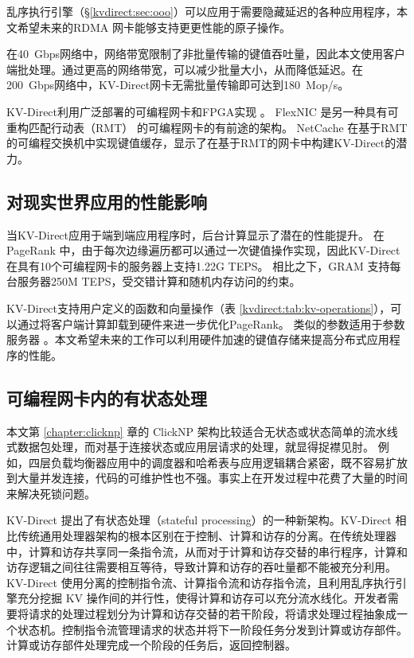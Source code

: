 乱序执行引擎（\S \ref {kvdirect:sec:ooo}）可以应用于需要隐藏延迟的各种应用程序，本文希望未来的RDMA 网卡能够支持更更性能的原子操作。

在40~Gbps网络中，网络带宽限制了非批量传输的键值吞吐量，因此本文使用客户端批处理。通过更高的网络带宽，可以减少批量大小，从而降低延迟。在200~Gbps网络中，KV-Direct网卡无需批量传输即可达到180~Mop/s。

KV-Direct利用广泛部署的可编程网卡和FPGA实现 \cite{putnam2014reconfigurable,caulfield2016cloud}。 FlexNIC \cite {kaufmann2015flexnic,kaufmann2016krishnamurthy} 是另一种具有可重构匹配行动表（RMT） \cite {bosshart2013forwarding} 的可编程网卡的有前途的架构。
NetCache \cite {netcache-sosp17} 在基于RMT的可编程交换机中实现键值缓存，显示了在基于RMT的网卡中构建KV-Direct的潜力。

\subsection{对现实世界应用的性能影响}

当KV-Direct应用于端到端应用程序时，后台计算显示了潜在的性能提升。 在PageRank \cite {page1999pagerank}中，由于每次边缘遍历都可以通过一次键值操作实现，因此KV-Direct在具有10个可编程网卡的服务器上支持1.22G TEPS。 相比之下，GRAM \cite {wu2015g}支持每台服务器250M TEPS，受交错计算和随机内存访问的约束。

KV-Direct支持用户定义的函数和向量操作（表 \ref {kvdirect:tab:kv-operations}），可以通过将客户端计算卸载到硬件来进一步优化PageRank。 类似的参数适用于参数服务器 \cite {li2014scaling}。本文希望未来的工作可以利用硬件加速的键值存储来提高分布式应用程序的性能。

\subsection{可编程网卡内的有状态处理}
\label{kvdirect:sec:stateful-nic}

本文第 \ref{chapter:clicknp} 章的 ClickNP 架构比较适合无状态或状态简单的流水线式数据包处理，而对基于连接状态或应用层请求的处理，就显得捉襟见肘。
例如，四层负载均衡器应用中的调度器和哈希表与应用逻辑耦合紧密，既不容易扩放到大量并发连接，代码的可维护性也不强。事实上在开发过程中花费了大量的时间来解决死锁问题。

KV-Direct 提出了有状态处理（stateful processing）的一种新架构。KV-Direct 相比传统通用处理器架构的根本区别在于控制、计算和访存的分离。在传统处理器中，计算和访存共享同一条指令流，从而对于计算和访存交替的串行程序，计算和访存逻辑之间往往需要相互等待，导致计算和访存的吞吐量都不能被充分利用。KV-Direct 使用分离的控制指令流、计算指令流和访存指令流，且利用乱序执行引擎充分挖掘 KV 操作间的并行性，使得计算和访存可以充分流水线化。开发者需要将请求的处理过程划分为计算和访存交替的若干阶段，将请求处理过程抽象成一个状态机。控制指令流管理请求的状态并将下一阶段任务分发到计算或访存部件。计算或访存部件处理完成一个阶段的任务后，返回控制器。

